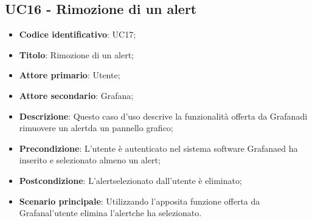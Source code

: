 \subsection{UC16 - Rimozione di un alert}
\begin{itemize}
	\item \textbf{Codice identificativo}: UC17;
	\item \textbf{Titolo}: Rimozione di un alert\glo;
	\item \textbf{Attore primario}: Utente;
	\item \textbf{Attore secondario}: Grafana\glo;
	\item \textbf{Descrizione}: Questo caso d'uso descrive la funzionalità offerta da Grafana\glosp di rimuovere un alert\glosp da un pannello grafico;
	\item \textbf{Precondizione}: L'utente è autenticato nel sistema software Grafana\glosp ed ha inserito e selezionato almeno un alert\glo;
	\item \textbf{Postcondizione}: L'alert\glosp selezionato dall'utente è eliminato;
	\item \textbf{Scenario principale}: Utilizzando l'apposita funzione offerta da Grafana\glosp l'utente elimina l'alert\glosp che ha selezionato.
\end{itemize} 
